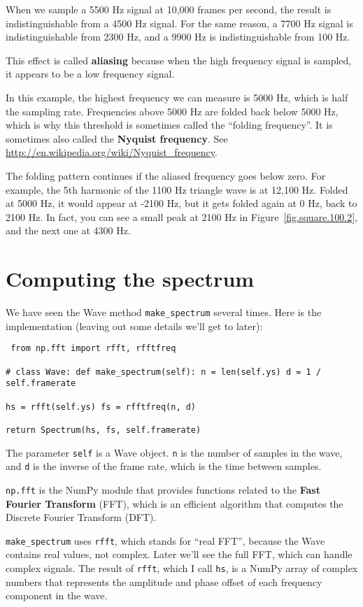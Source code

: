 \documentclass[12pt]{book} \usepackage[width=5.5in,height=8.5in, hmarginratio=3:2,vmarginratio=1:1]{geometry}
\begin{document}
When we sample a 5500 Hz signal at 10,000 frames per second, the result is indistinguishable from a 4500 Hz signal. For the same reason, a 7700 Hz signal is indistinguishable from 2300 Hz, and a 9900 Hz is indistinguishable from 100 Hz. 

This effect is called {\bf aliasing} because when the high frequency signal is sampled, it appears to be a low frequency signal. 

In this example, the highest frequency we can measure is 5000 Hz, which is half the sampling rate. Frequencies above 5000 Hz are folded back below 5000 Hz, which is why this threshold is sometimes called the ``folding frequency''. It is sometimes also called the {\bf Nyquist frequency}. See \url{http://en.wikipedia.org/wiki/Nyquist_frequency}. 

The folding pattern continues if the aliased frequency goes below zero. For example, the 5th harmonic of the 1100 Hz triangle wave is at 12,100 Hz. Folded at 5000 Hz, it would appear at -2100 Hz, but it gets folded again at 0 Hz, back to 2100 Hz. In fact, you can see a small peak at 2100 Hz in Figure~\ref{fig.square.100.2}, and the next one at 4300 Hz. 

\section{Computing the spectrum} 

We have seen the Wave method \verb"make_spectrum" several times. Here is the implementation (leaving out some details we'll get to later): 

\begin{verbatim} from np.fft import rfft, rfftfreq 

# class Wave: def make_spectrum(self): n = len(self.ys) d = 1 / self.framerate 

hs = rfft(self.ys) fs = rfftfreq(n, d) 

return Spectrum(hs, fs, self.framerate) \end{verbatim} 

The parameter {\tt self} is a Wave object. {\tt n} is the number of samples in the wave, and {\tt d} is the inverse of the frame rate, which is the time between samples. 

{\tt np.fft} is the NumPy module that provides functions related to the {\bf Fast Fourier Transform} (FFT), which is an efficient algorithm that computes the Discrete Fourier Transform (DFT). 

\verb"make_spectrum" uses {\tt rfft}, which stands for ``real FFT'', because the Wave contains real values, not complex. Later we'll see the full FFT, which can handle complex signals. The result of {\tt rfft}, which I call {\tt hs}, is a NumPy array of complex numbers that represents the amplitude and phase offset of each frequency component in the wave. 
\end{document}
